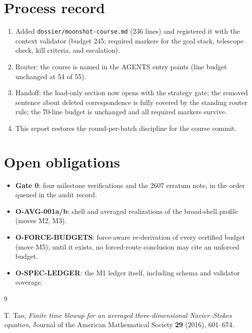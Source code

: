 \documentclass[11pt]{article}
\theoremstyle{remark}
\begin{document}
\section{Process record}

\begin{enumerate}
\item Added \texttt{dossier/moonshot-course.md} (236 lines) and
registered it with the context validator (budget 245; required markers
for the goal stack, telescope check, kill criteria, and escalation).
\item Router: the course is named in the AGENTS entry points (line
budget unchanged at 54 of 55).
\item Handoff: the load-only section now opens with the strategy gate;
the removed sentence about deleted correspondence is fully covered by
the standing router rule; the 70-line budget is unchanged and all
required markers survive.
\item This report restores the round-per-batch discipline for the
course commit.
\end{enumerate}

\section{Open obligations}

\begin{itemize}
\item \textbf{Gate 0}: four milestone verifications and the 2607
erratum note, in the order queued in the audit record.
\item \textbf{O-AVG-001a/b}: shell and averaged realizations of the
broad-shell profile (moves M2, M3).
\item \textbf{O-FORCE-BUDGETS}: force-aware re-derivation of every
certified budget (move M5); until it exists, no forced-route conclusion
may cite an unforced budget.
\item \textbf{O-SPEC-LEDGER}: the M1 ledger itself, including schema
and validator coverage.
\end{itemize}

\begin{thebibliography}{9}

T. Tao,
\emph{Finite time blowup for an averaged three-dimensional
Navier--Stokes equation},
Journal of the American Mathematical Society \textbf{29} (2016),
601--674.

\end{thebibliography}
\end{document}
